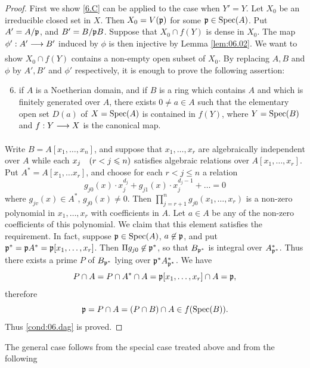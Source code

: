 \documentclass[../main]{subfiles}
\begin{document}
\begin{proof}
First we show \ref{6.C} can be applied to the case when $Y' = Y$. Let $X_0$ be an irreducible closed set in $X$. Then $X_0 = V(\mathfrak{p})$ for some $\mathfrak{p} \in \operatorname{Spec}(A)$. Put $A' = A / \mathfrak{p}$, and $B' = B / \mathfrak{p} B$. Suppose that $X_0 \cap f(Y)$ is dense in $X_0$. The map $\phi' : A' \varrightarrow{} B'$ induced by $\phi$ is then injective by Lemma \ref{lem:06.02}. We want to show $X_0 \cap f(Y)$ contains a non-empty open subset of $X_0$. By replacing $A,B$ and $\phi$ by $A', B'$ and $\phi'$ respectively, it is enough to prove the following assertion:

\begin{enumerate}[label=(\arabic*.$\dagger$)]\setcounter{enumi}{5}
    \item\label{cond:06.dag} if $A$ is a Noetherian domain, and if $B$ is a ring which contains $A$ and which is finitely generated over $A$, there exists $0 \ne a \in A$ such that the elementary open set $D(a)$ of $X=\operatorname{Spec}(A)$ is contained in $f(Y)$, where $Y=\operatorname{Spec}(B)$ and $f: Y \varrightarrow{} X$ is the canonical map.
\end{enumerate}

Write $B=A[x_1, \ldots, x_n]$, and suppose that $x_1,\ldots,x_r$ are algebraically independent over $A$ while each $x_j\for{r<j\leqslant n}$ satisfies algebraic relations over $A[x_1, \ldots, x_r]$. Put $A^* = A[x_1, \ldots x_r]$, and choose for each $r < j \le n$ a relation
\[
g_{j0}(x) \cdot x_j ^{d_j} + g_{j1}(x) \cdot x_j ^{d_j-1} + \dots = 0
\]
where $g_{jv} (x) \in A^*$, $g_{j0}(x) \ne 0$. Then $\prod_{j=r+1} ^n g_{j0} (x_1, \dots, x_r)$ is a non-zero polynomial in $x_1, \dots, x_r$ with coefficients in $A$. Let $a \in A$ be any of the non-zero coefficients of this polynomial. We claim that this element satisfies the requirement. In fact, suppose $\mathfrak{p} \in \operatorname{Spec}(A)$, $a \not\in \mathfrak{p}$, and put $\mathfrak{p}^* =\mathfrak{p} A^* = \mathfrak{p}[x_1, \dots, x_r]$. Then $\Pi g_{j0} \not\in \mathfrak{p}^*$, so that $B_{\mathfrak{p}^*}$ is integral over $A^* _{\mathfrak{p}^*}$. Thus there exists a prime $P$ of $B_{\mathfrak{p}^*}$ lying over $\mathfrak{p}^* A^* _{\mathfrak{p}^*}$. We have
\[
P \cap A = P \cap A^* \cap A = \mathfrak{p}[x_1,\dots,x_r]\cap A = \mathfrak{p},
\]
therefore 
\[
\mathfrak{p} = P \cap A = (P \cap B) \cap A \in f(\operatorname{Spec}(B)).
\]
Thus \ref{cond:06.dag} is proved.
\end{proof}

The general case follows from the special case treated above and from the following
\end{document}
